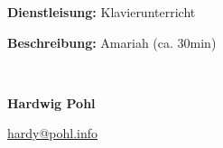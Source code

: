 \documentclass[
	a4paper, %
	10pt, %
]{CSMinimalInvoice}
\begin{document}




\outputinvoicenum %

\begin{minipage}[t]{0.38\textwidth}
	
	\textbf{Dienstleisung:} Klavierunterricht %
	
	\textbf{Beschreibung:} Amariah (ca. 30min) %
\end{minipage}
\begin{minipage}[t]{0.03\textwidth}
	~ %
\end{minipage}
\begin{minipage}[t]{0.56\textwidth}
	\textbf{Hardwig Pohl} %
	
	\href{mailto:hardy@pohl.info}{hardy@pohl.info} %
\end{minipage}



\vfill %

\end{document}
